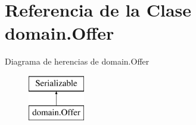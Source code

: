 \hypertarget{classdomain_1_1_offer}{}\section{Referencia de la Clase domain.\+Offer}
\label{classdomain_1_1_offer}
Diagrama de herencias de domain.\+Offer\begin{figure}[H]
\begin{center}
\leavevmode
\includegraphics[height=2.000000cm]{classdomain_1_1_offer}
\end{center}
\end{figure}
